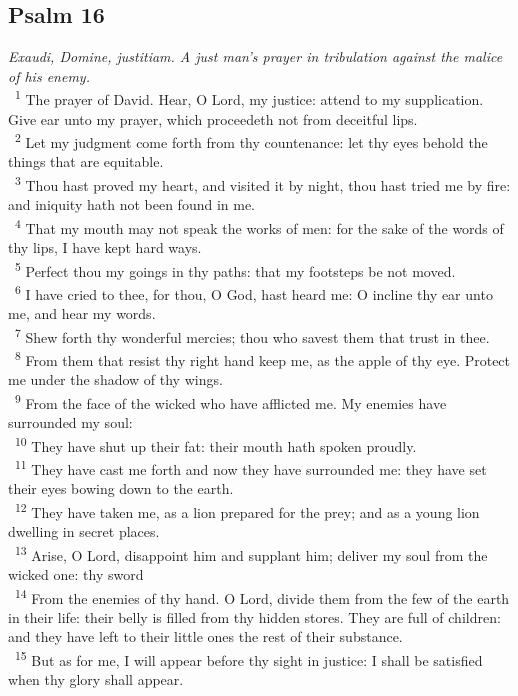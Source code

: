 \documentclass[a5paper,12pt]{article}
\begin{document}
\begin{multicols*}{2}
\section{Psalm 16}
\label{sec:org17d7da3}
\emph{Exaudi, Domine, justitiam. A just man's prayer in tribulation against the malice of his enemy.}\\

~\textsuperscript{1} The prayer of David. Hear, O Lord, my justice: attend to my supplication. Give ear unto my prayer, which proceedeth not from deceitful lips.\\
~\textsuperscript{2} Let my judgment come forth from thy countenance: let thy eyes behold the things that are equitable.\\
~\textsuperscript{3} Thou hast proved my heart, and visited it by night, thou hast tried me by fire: and iniquity hath not been found in me.\\
~\textsuperscript{4} That my mouth may not speak the works of men: for the sake of the words of thy lips, I have kept hard ways.\\
~\textsuperscript{5} Perfect thou my goings in thy paths: that my footsteps be not moved.\\
~\textsuperscript{6} I have cried to thee, for thou, O God, hast heard me: O incline thy ear unto me, and hear my words.\\
~\textsuperscript{7} Shew forth thy wonderful mercies; thou who savest them that trust in thee.\\
~\textsuperscript{8} From them that resist thy right hand keep me, as the apple of thy eye. Protect me under the shadow of thy wings.\\
~\textsuperscript{9} From the face of the wicked who have afflicted me. My enemies have surrounded my soul:\\
~\textsuperscript{10} They have shut up their fat: their mouth hath spoken proudly.\\
~\textsuperscript{11} They have cast me forth and now they have surrounded me: they have set their eyes bowing down to the earth.\\
~\textsuperscript{12} They have taken me, as a lion prepared for the prey; and as a young lion dwelling in secret places.\\
~\textsuperscript{13} Arise, O Lord, disappoint him and supplant him; deliver my soul from the wicked one: thy sword\\
~\textsuperscript{14} From the enemies of thy hand. O Lord, divide them from the few of the earth in their life: their belly is filled from thy hidden stores. They are full of children: and they have left to their little ones the rest of their substance.\\
~\textsuperscript{15} But as for me, I will appear before thy sight in justice: I shall be satisfied when thy glory shall appear.\\


\end{multicols*}
\end{document}
